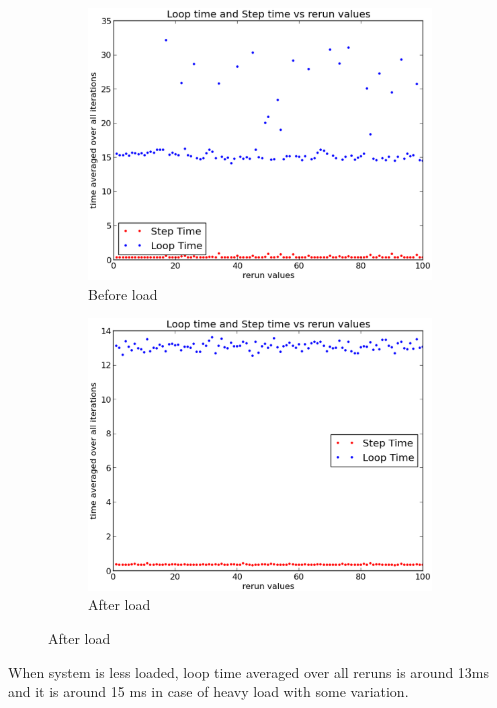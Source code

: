 \documentclass[a4paper,11pt]{article}
\begin{document}
{{\begin{figure}[h]
\centering
\begin{subfigure}{.5\textwidth}
  \centering
  \includegraphics[width=1.0\linewidth]{plot3}
  \caption{Before load}
\end{subfigure}%
\begin{subfigure}{.5\textwidth}
  \centering
  \includegraphics[width=1.0\linewidth]{plot4}
  \caption{After load}
\end{subfigure}
\end{figure}

\indent When system is less loaded, loop time averaged over all reruns is around 13ms and it is around 15 ms in case of heavy load with some variation. 
}



}
\end{document}
